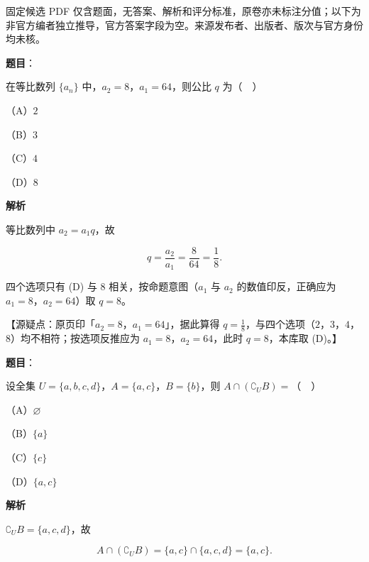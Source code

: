 

\begin{gktip}
固定候选 PDF 仅含题面，无答案、解析和评分标准，原卷亦未标注分值；以下为非官方编者独立推导，官方答案字段为空。来源发布者、出版者、版次与官方身份均未核。
\end{gktip}

\begin{answer}

\textbf{题目}：

在等比数列 $\{a_n\}$ 中，$a_2=8$，$a_1=64$，则公比 $q$ 为（　）

（A）$2$

（B）$3$

（C）$4$

（D）$8$

\textbf{解析}

等比数列中 $a_2=a_1q$，故

\nopagebreak[4]
\[q=\frac{a_2}{a_1}=\frac8{64}=\frac18.\]

四个选项只有 (D) 与 $8$ 相关，按命题意图（$a_1$ 与 $a_2$ 的数值印反，正确应为 $a_1=8$，$a_2=64$）取 $q=8$。

【源疑点：原页印「$a_2=8$，$a_1=64$」，据此算得 $q=\frac18$，与四个选项（$2$，$3$，$4$，$8$）均不相符；按选项反推应为 $a_1=8$，$a_2=64$，此时 $q=8$，本库取 (D)。】


\end{answer}
\begin{answer}

\textbf{题目}：

设全集 $U=\{a,b,c,d\}$，$A=\{a,c\}$，$B=\{b\}$，则 $A\cap(\complement_UB)=$（　）

（A）$\varnothing$

（B）$\{a\}$

（C）$\{c\}$

（D）$\{a,c\}$

\textbf{解析}

$\complement_UB=\{a,c,d\}$，故

\nopagebreak[4]
\[A\cap(\complement_UB)=\{a,c\}\cap\{a,c,d\}=\{a,c\}.\]


\end{answer}
